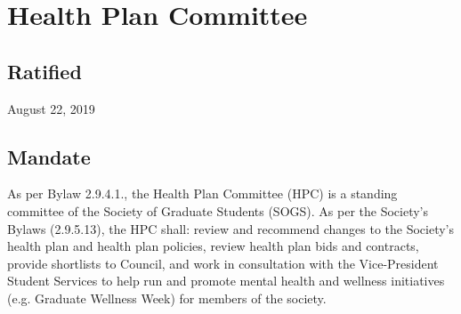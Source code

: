 \section{Health Plan Committee}

\subsection{Ratified}
August 22, 2019

\subsection{Mandate}
As per Bylaw 2.9.4.1., the Health Plan Committee (HPC) is a standing committee of the Society of Graduate Students (SOGS). As per the Society’s Bylaws (2.9.5.13), the HPC shall: review and recommend changes to the Society’s health plan and health plan policies, review health plan bids and contracts, provide shortlists to Council, and work in consultation with the Vice-President Student Services to help run and promote mental health and wellness initiatives (e.g. Graduate Wellness Week) for members of the society.

